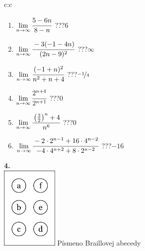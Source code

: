 \documentclass[10pt]{report}
\begin{document}
\begin{tabular}{c:c}
\begin{minipage}[c][104.5mm][t]{0.5\linewidth}
\begin{center}
\begin{minipage}{0.79\linewidth}
\begin{center}
\begin{varwidth}{\linewidth}
\begin{enumerate}
\normalsize
\item $\lim\limits_{n\to\infty}\cfrac{5-6n}{8-n}$\quad \dotfill\; ???\;\dotfill \quad $6$
\item $\lim\limits_{n\to\infty}\cfrac{-3(-1-4n)}{(2n-9)^2}$\quad \dotfill\; ???\;\dotfill \quad $\infty$
\item $\lim\limits_{n\to\infty}\cfrac{(-1+n)^2}{n^2+n+4}$\quad \dotfill\; ???\;\dotfill \quad $\nicefrac{-1}{4}$
\item $\lim\limits_{n\to\infty}\cfrac{2^{n+4}}{2^{n+1}}$\quad \dotfill\; ???\;\dotfill \quad $0$
\item $\lim\limits_{n\to\infty}\cfrac{\left(\frac{3}{2}\right)^n +4}{n^{6}}$\quad \dotfill\; ???\;\dotfill \quad $0$
\item $\lim\limits_{n\to\infty}\cfrac{-2\cdot 2^{n-1}+16\cdot 4^{n-2}}{-4\cdot 4^{n+2}+8\cdot 2^{n-2}}$\quad \dotfill\; ???\;\dotfill \quad $-16$
\end{enumerate}
\end{varwidth}
\end{center}
\end{minipage}
\begin{minipage}{0.20\linewidth}
\begin{center}
{\Huge\bfseries 4.} \\[2mm]
\includegraphics[height=40mm]{../images/braille.png}
{\small Písmeno Braillovej abecedy}
\end{center}
\end{minipage}
\end{center}
\end{minipage}
%
\end{tabular}
\newpage
\thispagestyle{empty}
\end{document}
